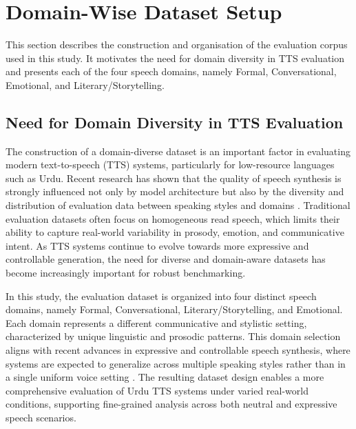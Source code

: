 \documentclass[a4paper,fleqn]{cas-dc}
\begin{document}
    
    
    
    \section{Domain-Wise Dataset Setup}\label{sec:domain-setup}

    This section describes the construction and organisation of the evaluation corpus used in this study. It motivates the need for domain diversity in TTS evaluation and presents each of the four speech domains, namely Formal, Conversational, Emotional, and Literary/Storytelling.

    \subsection{Need for Domain Diversity in TTS Evaluation}
    \indent The construction of a domain-diverse dataset is an important factor in evaluating modern text-to-speech (TTS) systems, particularly for low-resource languages such as Urdu. Recent research has shown that the quality of speech synthesis is strongly influenced not only by model architecture but also by the diversity and distribution of evaluation data between speaking styles and domains \citep{kong2020hifigan, tan2021neuraltts}. Traditional evaluation datasets often focus on homogeneous read speech, which limits their ability to capture real-world variability in prosody, emotion, and communicative intent. As TTS systems continue to evolve towards more expressive and controllable generation, the need for diverse and domain-aware datasets has become increasingly important for robust benchmarking.
    
    In this study, the evaluation dataset is organized into four distinct speech domains, namely Formal, Conversational, Literary/Storytelling, and Emotional. Each domain represents a different communicative and stylistic setting, characterized by unique linguistic and prosodic patterns. This domain selection aligns with recent advances in expressive and controllable speech synthesis, where systems are expected to generalize across multiple speaking styles rather than in a single uniform voice setting \citep{wang2017tacotron, kim2021vits}. The resulting dataset design enables a more comprehensive evaluation of Urdu TTS systems under varied real-world conditions, supporting fine-grained analysis across both neutral and expressive speech scenarios.
    
\end{document}
